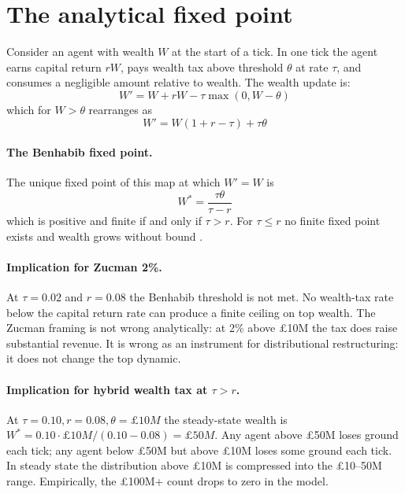 \documentclass[11pt]{article}
\begin{document}
\section{The analytical fixed point}
\label{sec:fixedpoint}

Consider an agent with wealth $W$ at the start of a tick.  In one
tick the agent earns capital return $rW$, pays wealth tax above
threshold $\theta$ at rate $\tau$, and consumes a negligible amount
relative to wealth.  The wealth update is:
\begin{equation}
W' = W + rW - \tau \max(0, W - \theta)
\end{equation}
which for $W > \theta$ rearranges as
\begin{equation}
W' = W(1 + r - \tau) + \tau \theta
\end{equation}

\paragraph{The Benhabib fixed point.}  The unique fixed point of
this map at which $W' = W$ is
\begin{equation}
W^* = \frac{\tau \theta}{\tau - r}
\end{equation}
which is positive and finite if and only if $\tau > r$.  For
$\tau \leq r$ no finite fixed point exists and wealth grows
without bound \citep{benhabib2011distribution}.

\paragraph{Implication for Zucman 2\%.}  At $\tau = 0.02$ and
$r = 0.08$ the Benhabib threshold is not met.  No wealth-tax
rate below the capital return rate can produce a finite ceiling
on top wealth.  The Zucman framing is not wrong analytically: at
2\% above \pounds 10M the tax does raise substantial revenue.  It
is wrong as an instrument for distributional restructuring: it
does not change the top dynamic.

\paragraph{Implication for hybrid wealth tax at $\tau > r$.}  At
$\tau = 0.10, r = 0.08, \theta = \pounds 10M$ the steady-state
wealth is $W^* = 0.10 \cdot \pounds 10M / (0.10 - 0.08) = \pounds
50M$.  Any agent above \pounds 50M loses ground each tick; any
agent below \pounds 50M but above \pounds 10M loses some ground
each tick.  In steady state the distribution above \pounds 10M is
compressed into the \pounds 10--50M range.  Empirically, the
\pounds 100M+ count drops to zero in the model.
\end{document}

